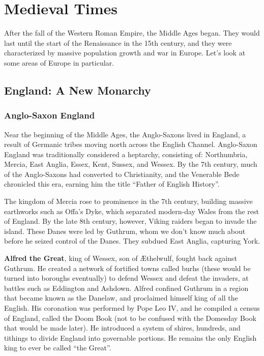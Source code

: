 \chapter{Medieval Times}

After the fall of the Western Roman Empire, the Middle Ages began.
They would last until the start of the Renaissance in the 15th century,
and they were characterized by massive population growth and war in Europe.
Let's look at some areas of Europe in particular.

\section{England: A New Monarchy}

\subsection*{Anglo-Saxon England}

Near the beginning of the Middle Ages, the Anglo-Saxons lived in England,
a result of Germanic tribes moving north across the English Channel.
Anglo-Saxon England was traditionally considered a heptarchy, consisting of:
Northumbria, Mercia, East Anglia, Essex, Kent, Sussex, and Wessex.
By the 7th century, much of the Anglo-Saxons had converted to Christianity,
and the Venerable Bede chronicled this era, earning him the title ``Father of English History''.

The kingdom of Mercia rose to prominence in the 7th century, building massive earthworks such as
Offa's Dyke, which separated modern-day Wales from the rest of England.
By the late 8th century, however, Viking raiders began to invade the island.
These Danes were led by Guthrum, whom we don't know much about before he seized control of the Danes.
They subdued East Anglia, capturing York.

\textbf{Alfred the Great}, king of Wessex, son of \AE{}thelwulf, fought back against Guthrum.
He created a network of fortified towns called burhs (these would be turned into boroughs eventually)
to defend Wessex and defeat the invaders, at battles such as Eddington and Ashdown.
Alfred confined Guthrum in a region that became known as the Danelaw, and proclaimed himself king of all the English.
His coronation was performed by Pope Leo IV, and
he compiled a census of England, called the Doom Book
(not to be confused with the Domesday Book that would be made later).
He introduced a system of shires, hundreds, and tithings to divide England into governable portions.
He remains the only English king to ever be called ``the Great''.

